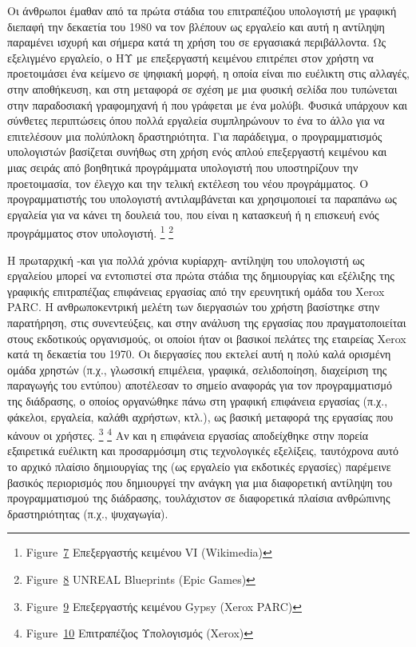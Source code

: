 \documentclass[
]{article}
\begin{document}
Οι άνθρωποι έμαθαν από τα πρώτα στάδια του επιτραπέζιου υπολογιστή με
γραφική διεπαφή την δεκαετία του 1980 να τον βλέπουν ως εργαλείο και
αυτή η αντίληψη παραμένει ισχυρή και σήμερα κατά τη χρήση του σε
εργασιακά περιβάλλοντα. Ως εξελιγμένο εργαλείο, ο ΗΥ με επεξεργαστή
κειμένου επιτρέπει στον χρήστη να προετοιμάσει ένα κείμενο σε ψηφιακή
μορφή, η οποία είναι πιο ευέλικτη στις αλλαγές, στην αποθήκευση, και στη
μεταφορά σε σχέση με μια φυσική σελίδα που τυπώνεται στην παραδοσιακή
γραφομηχανή ή που γράφεται με ένα μολύβι. Φυσικά υπάρχουν και σύνθετες
περιπτώσεις όπου πολλά εργαλεία συμπληρώνουν το ένα το άλλο για να
επιτελέσουν μια πολύπλοκη δραστηριότητα. Για παράδειγμα, ο
προγραμματισμός υπολογιστών βασίζεται συνήθως στη χρήση ενός απλού
επεξεργαστή κειμένου και μιας σειράς από βοηθητικά προγράμματα
υπολογιστή που υποστηρίζουν την προετοιμασία, τον έλεγχο και την τελική
εκτέλεση του νέου προγράμματος. Ο προγραμματιστής του υπολογιστή
αντιλαμβάνεται και χρησιμοποιεί τα παραπάνω ως εργαλεία για να κάνει τη
δουλειά του, που είναι η κατασκευή ή η επισκευή ενός προγράμματος στον
υπολογιστή. \footnote{Figure~\protect\hyperlink{fig:vi-editor}{7}
  Επεξεργαστής κειμένου VI (Wikimedia)} \footnote{Figure~\protect\hyperlink{fig:unreal-blueprints}{8}
  UNREAL Blueprints (Epic Games)}

Η πρωταρχική -και για πολλά χρόνια κυρίαρχη- αντίληψη του υπολογιστή ως
εργαλείου μπορεί να εντοπιστεί στα πρώτα στάδια της δημιουργίας και
εξέλιξης της γραφικής επιτραπέζιας επιφάνειας εργασίας από την
ερευνητική ομάδα του Xerox PARC. Η ανθρωποκεντρική μελέτη των διεργασιών
του χρήστη βασίστηκε στην παρατήρηση, στις συνεντεύξεις, και στην
ανάλυση της εργασίας που πραγματοποιείται στους εκδοτικούς οργανισμούς,
οι οποίοι ήταν οι βασικοί πελάτες της εταιρείας Xerox κατά τη δεκαετία
του 1970. Οι διεργασίες που εκτελεί αυτή η πολύ καλά ορισμένη ομάδα
χρηστών (π.χ., γλωσσική επιμέλεια, γραφικά, σελιδοποίηση, διαχείριση της
παραγωγής του εντύπου) αποτέλεσαν το σημείο αναφοράς για τον
προγραμματισμό της διάδρασης, ο οποίος οργανώθηκε πάνω στη γραφική
επιφάνεια εργασίας (π.χ., φάκελοι, εργαλεία, καλάθι αχρήστων, κτλ.), ως
βασική μεταφορά της εργασίας που κάνουν οι χρήστες. \footnote{Figure~\protect\hyperlink{fig:xerox-gypsy}{9}
  Επεξεργαστής κειμένου Gypsy (Xerox PARC)} \footnote{Figure~\protect\hyperlink{fig:desktop}{10}
  Επιτραπέζιος Υπολογισμός (Xerox)} Αν και η επιφάνεια εργασίας
αποδείχθηκε στην πορεία εξαιρετικά ευέλικτη και προσαρμόσιμη στις
τεχνολογικές εξελίξεις, ταυτόχρονα αυτό το αρχικό πλαίσιο δημιουργίας
της (ως εργαλείο για εκδοτικές εργασίες) παρέμεινε βασικός περιορισμός
που δημιουργεί την ανάγκη για μια διαφορετική αντίληψη του
προγραμματισμού της διάδρασης, τουλάχιστον σε διαφορετικά πλαίσια
ανθρώπινης δραστηριότητας (π.χ., ψυχαγωγία).
\end{document}
